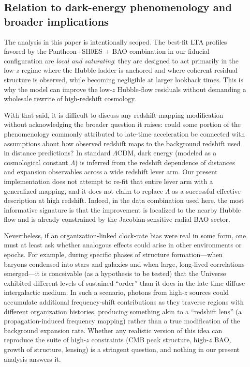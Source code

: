 \documentclass[10pt]{article}
\begin{document}
\subsection{Relation to dark-energy phenomenology and broader implications}
\label{sec:discussion_de}

The analysis in this paper is intentionally scoped. The best-fit LTA profiles favored by the
Pantheon+SH0ES + BAO combination in our fiducial configuration are \emph{local and saturating}:
they are designed to act primarily in the low-$z$ regime where the Hubble ladder is anchored and
where coherent residual structure is observed, while becoming negligible at larger lookback times.
This is why the model can improve the low-$z$ Hubble-flow residuals without demanding a wholesale
rewrite of high-redshift cosmology.

With that said, it is difficult to discuss any redshift-mapping modification without acknowledging
the broader question it raises: could some portion of the phenomenology commonly attributed to
late-time acceleration be connected with assumptions about how observed redshift maps to the
background redshift used in distance predictions? In standard $\Lambda$CDM, dark energy (modeled as
a cosmological constant $\Lambda$) is inferred from the redshift dependence of distances and
expansion observables across a wide redshift lever arm. Our present implementation does not attempt
to re-fit that entire lever arm with a generalized mapping, and it does not claim to replace
$\Lambda$ as a successful effective description at high redshift. Indeed, in the data combination
used here, the most informative signature is that the improvement is localized to the nearby
Hubble flow and is already constrained by the Jacobian-sensitive radial BAO sector.

Nevertheless, if an organization-linked clock-rate bias were real in some form, one must at least
ask whether analogous effects could arise in other environments or epochs. For example, during
specific phases of structure formation---when baryons condensed into stars and galaxies and when
large, long-lived correlations emerged---it is conceivable (as a hypothesis to be tested) 
that the Universe exhibited different levels of sustained ``order'' than it does in the
late-time diffuse intergalactic medium. In such a scenario, photons from high-$z$ sources could
accumulate additional frequency-shift contributions as they traverse regions with different
organization histories, producing something akin to a ``redshift lens'' (a propagation-induced
frequency mapping) rather than a true modification of the background expansion rate. Whether any
realistic version of this idea can reproduce the suite of high-$z$ constraints (CMB peak structure,
high-$z$ BAO, growth of structure, lensing) is a stringent question, and nothing in our present
analysis answers it.
\end{document}
